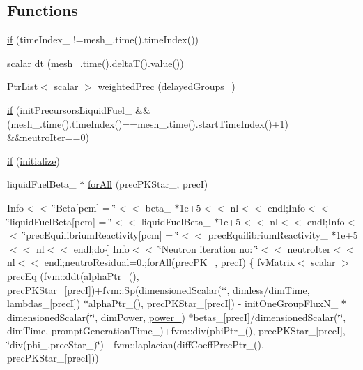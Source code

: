 \subsection*{Functions}
\begin{DoxyCompactItemize}
\item 
\hyperlink{solvePointKineticsLiquidFuel_8H_a5f7d3dd28e09080f8f663c61e98355b7}{if} (time\+Index\+\_\+ !=mesh\+\_\+.\+time().time\+Index())
\item 
scalar \hyperlink{solvePointKineticsLiquidFuel_8H_a5bbfd838dc83547e202d54a2d8578182}{dt} (mesh\+\_\+.\+time().deltaT().value())
\item 
Ptr\+List$<$ scalar $>$ \hyperlink{solvePointKineticsLiquidFuel_8H_a056af3c483d96d8b3afe03e52ad0ed8b}{weighted\+Prec} (delayed\+Groups\+\_\+)
\item 
\hyperlink{solvePointKineticsLiquidFuel_8H_a1b9be144f7d611332d58d4ee77859c1b}{if} (init\+Precursors\+Liquid\+Fuel\+\_\+ \&\&(mesh\+\_\+.\+time().time\+Index()==mesh\+\_\+.\+time().start\+Time\+Index()+1) \&\&\hyperlink{solveNeutronicsSP3_8H_a5ea48e0170faff29dfdd3cbba330d51d}{neutro\+Iter}==0)
\item 
\hyperlink{solvePointKineticsLiquidFuel_8H_a1790e42e5c2a42c948992ff407af2842}{if} (\hyperlink{solvePointKineticsLiquidFuel_8H_a51d89a8c672e71d2091a843cdba679e6}{initialize})
\item 
liquid\+Fuel\+Beta\+\_\+ $\ast$ \hyperlink{solvePointKineticsLiquidFuel_8H_a122b89469d514588e2714192d2c0dbc3}{for\+All} (prec\+P\+K\+Star\+\_\+, precI)
\item 
Info$<$$<$ \char`\"{}Beta\mbox{[}pcm\mbox{]} = \char`\"{}$<$$<$ beta\+\_\+ $\ast$1e+5$<$$<$ nl$<$$<$ endl;\+Info$<$$<$ \char`\"{}liquid\+Fuel\+Beta\mbox{[}pcm\mbox{]} = \char`\"{}$<$$<$ liquid\+Fuel\+Beta\+\_\+ $\ast$1e+5$<$$<$ nl$<$$<$ endl;\+Info$<$$<$ \char`\"{}prec\+Equilibrium\+Reactivity\mbox{[}pcm\mbox{]} = \char`\"{}$<$$<$ prec\+Equilibrium\+Reactivity\+\_\+ $\ast$1e+5$<$$<$ nl$<$$<$ endl;do\{ Info$<$$<$ \char`\"{}\+Neutron iteration no\+: \char`\"{}$<$$<$ neutro\+Iter$<$$<$ nl$<$$<$ endl;neutro\+Residual=0.;for\+All(prec\+P\+K\+\_\+, prec\+I) \{ fv\+Matrix$<$ scalar $>$ \hyperlink{solvePointKineticsLiquidFuel_8H_a5e2f3a5010ddcd840f3790e3d76842d6}{prec\+Eq} (fvm\+::ddt(alpha\+Ptr\+\_\+(), prec\+P\+K\+Star\+\_\+\mbox{[}precI\mbox{]})+fvm\+::\+Sp(dimensioned\+Scalar(\char`\"{}\char`\"{}, dimless/dim\+Time, lambdas\+\_\+\mbox{[}precI\mbox{]}) $\ast$alpha\+Ptr\+\_\+(), prec\+P\+K\+Star\+\_\+\mbox{[}precI\mbox{]}) -\/ init\+One\+Group\+Flux\+N\+\_\+ $\ast$dimensioned\+Scalar(\char`\"{}\char`\"{}, dim\+Power, \hyperlink{solvePointKineticsLiquidFuel_8H_a6db349ac2f1ddec3951d396b751c02a6}{power\+\_\+}) $\ast$betas\+\_\+\mbox{[}precI\mbox{]}/dimensioned\+Scalar(\char`\"{}\char`\"{}, dim\+Time, prompt\+Generation\+Time\+\_\+)+fvm\+::div(phi\+Ptr\+\_\+(), prec\+P\+K\+Star\+\_\+\mbox{[}precI\mbox{]}, \char`\"{}div(phi\+\_\+,prec\+Star\+\_\+)\char`\"{}) -\/ fvm\+::laplacian(diff\+Coeff\+Prec\+Ptr\+\_\+(), prec\+P\+K\+Star\+\_\+\mbox{[}precI\mbox{]}))

\end{DoxyCompactItemize}
